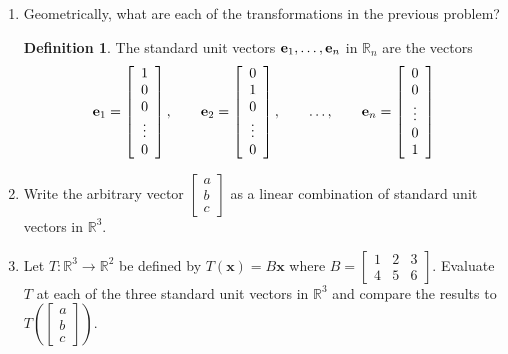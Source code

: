 \documentclass[12pt]{amsart}
\newcommand{\R}{\mathbb{R}}
\theoremstyle{definition}
\newtheorem*{definition}{Definition}
\begin{document}
\begin{enumerate}[itemsep=2.5em,leftmargin=0pt]

\item Geometrically, what are each of the transformations in the previous problem?


\begin{definition}
    The standard unit vectors ${\bf e}_1,\dots,{\bf e}_n$ in $\R_n$ are the vectors
    \[
        {\bf e}_1 = \left[\begin{array}{c}
            1 \\
            0 \\
            0 \\
            \vdots \\
            0
        \end{array}\right], \qquad
        {\bf e}_2 = \left[\begin{array}{c}
            0 \\
            1 \\
            0 \\
            \vdots \\
            0
        \end{array}\right], \qquad 
        \ldots, \qquad
        {\bf e}_n = \left[\begin{array}{c}
            0 \\
            0 \\
            \vdots \\
            0 \\
            1
        \end{array}\right]
    \]
\end{definition}


\item Write the arbitrary vector $\begin{bmatrix}a\\b\\c\end{bmatrix}$ as a linear combination of standard unit vectors in $\R^3$.


\item Let $T:\R^3\to\R^2$ be defined by $T(\mathbf{x})=B\mathbf{x}$ where $B=\begin{bmatrix} 1&2&3\\ 4&5&6 \end{bmatrix}$. Evaluate $T$ at each of the three standard unit vectors in $\R^3$ and compare the results to $T\left(\begin{bmatrix}a\\b\\c\end{bmatrix}\right)$.


\end{enumerate}
\end{document}
